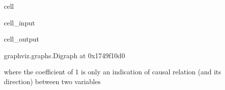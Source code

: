 \documentclass[letterpaper,10pt,english]{jupyterBook}
\begin{document}
\begin{sphinxuseclass}{cell}\begin{sphinxVerbatimInput}

\begin{sphinxuseclass}{cell_input}
\begin{sphinxVerbatim}[commandchars=\\\{\}]
   

  \PYG{p}{[}
    \PYG{p}{[}  \PYG{p}{]}   
    \PYG{p}{[}  \PYG{p}{]}   
    \PYG{p}{[}  \PYG{p}{]}    
\PYG{p}{]}

 \PYG{p}{[}  \PYG{p}{]}
\end{sphinxVerbatim}

\end{sphinxuseclass}\end{sphinxVerbatimInput}
\begin{sphinxVerbatimOutput}

\begin{sphinxuseclass}{cell_output}
\begin{sphinxVerbatim}[commandchars=\\\{\}]
\PYGZlt{}graphviz.graphs.Digraph at 0x1749f10d0\PYGZgt{}
\end{sphinxVerbatim}

\end{sphinxuseclass}\end{sphinxVerbatimOutput}

\end{sphinxuseclass}
\sphinxAtStartPar
where the coefficient of 1 is only an indication of causal relation (and its direction) between two variables
\end{document}
